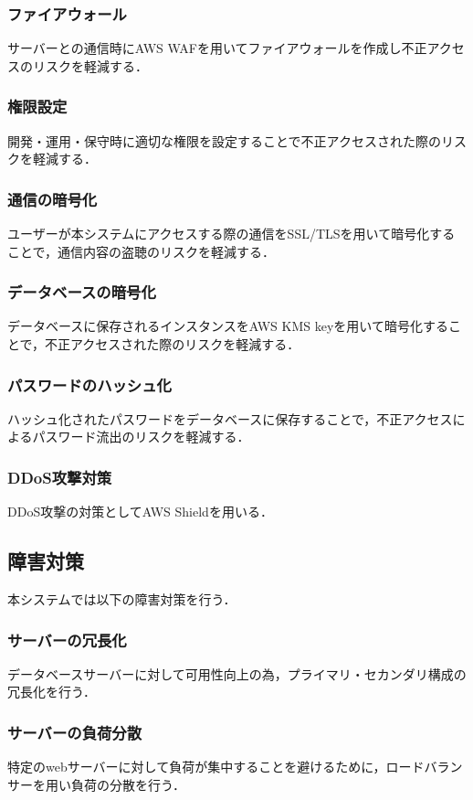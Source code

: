 \documentclass[a4paper, titlepage]{jsarticle}
\begin{document}
\subsubsection{ファイアウォール}
サーバーとの通信時にAWS WAFを用いてファイアウォールを作成し不正アクセスのリスクを軽減する．
\subsubsection{権限設定}
開発・運用・保守時に適切な権限を設定することで不正アクセスされた際のリスクを軽減する．
\subsubsection{通信の暗号化}
ユーザーが本システムにアクセスする際の通信をSSL/TLSを用いて暗号化することで，通信内容の盗聴のリスクを軽減する．
\subsubsection{データベースの暗号化}
データベースに保存されるインスタンスをAWS KMS keyを用いて暗号化することで，不正アクセスされた際のリスクを軽減する．
\subsubsection{パスワードのハッシュ化}
ハッシュ化されたパスワードをデータベースに保存することで，不正アクセスによるパスワード流出のリスクを軽減する．
\subsubsection{DDoS攻撃対策}
DDoS攻撃の対策としてAWS Shieldを用いる．
\subsection{障害対策}
本システムでは以下の障害対策を行う．
\subsubsection{サーバーの冗長化}
データベースサーバーに対して可用性向上の為，プライマリ・セカンダリ構成の冗長化を行う．
\subsubsection{サーバーの負荷分散}
特定のwebサーバーに対して負荷が集中することを避けるために，ロードバランサーを用い負荷の分散を行う．
\end{document}

